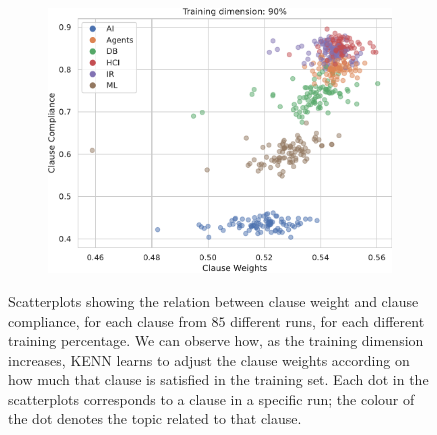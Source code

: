 \begin{figure}
\begin{subfigure}{0.5\textwidth}
	\centering
	\includegraphics[width=0.95\linewidth]{figures/scatter_90.pdf}
	\label{fig:ee}	
\end{subfigure}
\caption{Scatterplots showing the relation between clause weight and clause compliance, for each clause from $85$ different runs, for each different training percentage. We can observe how, as the training dimension increases, KENN learns to adjust the clause weights according on how much that clause is satisfied in the training set. Each dot in the scatterplots corresponds to a clause in a specific run; the colour of the dot denotes the topic related to that clause.}
\label{fig:corrplots}
\end{figure}

